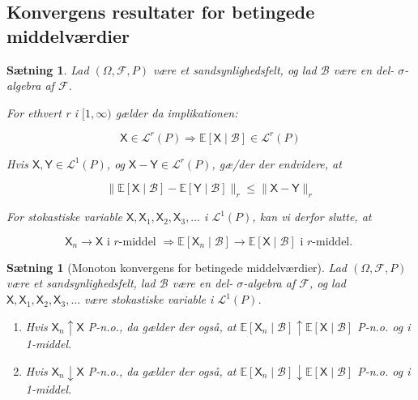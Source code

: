 \documentclass{article}
\newcommand{\1}{\mathbbm{1}}
\newcommand{\X}{\mathsf{X}}
\newcommand{\Y}{\mathsf{Y}}
\theoremstyle{boxed}
\newtheorem{proposition}[theorem]{Sætning}
\begin{document}
\subsection{Konvergens resultater for betingede middelværdier}
\begin{theorem-box}
    \begin{proposition}
        Lad $(\Omega, \mathcal{F}, P)$ være et sandsynlighedsfelt, og lad $\mathcal{B}$ være en del- $\sigma$-algebra af $\mathcal{F}$.

For ethvert r i $[1, \infty)$ gælder da implikationen:

$$
\X \in \mathcal{L}^r(P) \Longrightarrow \mathbb{E}[\X \mid \mathcal{B}] \in \mathcal{L}^r(P)
$$


Hvis $\X, \Y \in \mathcal{L}^1(P)$, og $\X-\Y \in \mathcal{L}^r(P)$, gæ/der der endvidere, at

$$
\|\mathbb{E}[\X \mid \mathcal{B}]-\mathbb{E}[\Y \mid \mathcal{B}]\|_r \leq\|\X-\Y\|_r
$$


For stokastiske variable $\X, \X_1, \X_2, \X_3, \ldots$ i $\mathcal{L}^1(P)$, kan vi derfor slutte, at

$$
\X_n \rightarrow \X \text { i } r \text {-middel } \Longrightarrow \mathbb{E}\left[\X_n \mid \mathcal{B}\right] \rightarrow \mathbb{E}[\X \mid \mathcal{B}] \text { i } r \text {-middel. }
$$

    \end{proposition}
\end{theorem-box}
\begin{theorem-box}
    \begin{proposition}[Monoton konvergens for betingede middelværdier]
        Lad $(\Omega, \mathcal{F}, P)$ være et sandsynlighedsfelt, lad $\mathcal{B}$ være en del- $\sigma$-algebra af $\mathcal{F}$, og lad $\X, \X_1, \X_2, \X_3, \ldots$ være stokastiske variable i $\mathcal{L}^1(P)$.
        \begin{enumerate}
            \item[\textnormal{(i)}] Hvis $\X_n \uparrow \X$ P-n.o., da gælder der også, at $\mathbb{E}\left[\X_n \mid \mathcal{B}\right] \uparrow \mathbb{E}[\X \mid \mathcal{B}]$ P-n.o. og i 1-middel.
            \item[\textnormal{(ii)}] Hvis $\X_n \downarrow \X$ P-n.o., da gælder der også, at $\mathbb{E}\left[\X_n \mid \mathcal{B}\right] \downarrow \mathbb{E}[\X \mid \mathcal{B}]$ P-n.o. og i 1-middel. 
        \end{enumerate}
    \end{proposition}
\end{theorem-box}
\end{document}
